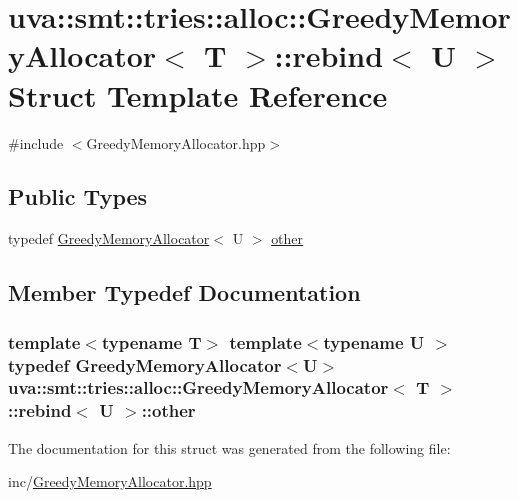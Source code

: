 \hypertarget{structuva_1_1smt_1_1tries_1_1alloc_1_1_greedy_memory_allocator_1_1rebind}{}\section{uva\+:\+:smt\+:\+:tries\+:\+:alloc\+:\+:Greedy\+Memory\+Allocator$<$ T $>$\+:\+:rebind$<$ U $>$ Struct Template Reference}
\label{structuva_1_1smt_1_1tries_1_1alloc_1_1_greedy_memory_allocator_1_1rebind}


{\ttfamily \#include $<$Greedy\+Memory\+Allocator.\+hpp$>$}

\subsection*{Public Types}
\begin{DoxyCompactItemize}
\item 
typedef \hyperlink{classuva_1_1smt_1_1tries_1_1alloc_1_1_greedy_memory_allocator}{Greedy\+Memory\+Allocator}$<$ U $>$ \hyperlink{structuva_1_1smt_1_1tries_1_1alloc_1_1_greedy_memory_allocator_1_1rebind_a4c9a2812bdf3606f7e8a1cbe635fea90}{other}
\end{DoxyCompactItemize}


\subsection{Member Typedef Documentation}
\hypertarget{structuva_1_1smt_1_1tries_1_1alloc_1_1_greedy_memory_allocator_1_1rebind_a4c9a2812bdf3606f7e8a1cbe635fea90}{}
\subsubsection[{other}]{\setlength{\rightskip}{0pt plus 5cm}template$<$typename T$>$ template$<$typename U $>$ typedef {\bf Greedy\+Memory\+Allocator}$<$U$>$ {\bf uva\+::smt\+::tries\+::alloc\+::\+Greedy\+Memory\+Allocator}$<$ T $>$\+::{\bf rebind}$<$ U $>$\+::{\bf other}}\label{structuva_1_1smt_1_1tries_1_1alloc_1_1_greedy_memory_allocator_1_1rebind_a4c9a2812bdf3606f7e8a1cbe635fea90}


The documentation for this struct was generated from the following file\+:\begin{DoxyCompactItemize}
\item 
inc/\hyperlink{_greedy_memory_allocator_8hpp}{Greedy\+Memory\+Allocator.\+hpp}\end{DoxyCompactItemize}
